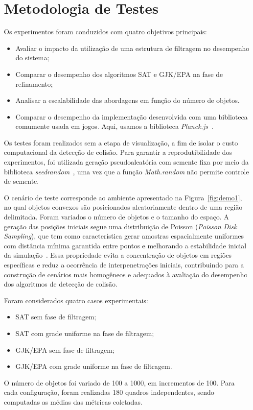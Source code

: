 \section{Metodologia de Testes}

Os experimentos foram conduzidos com quatro objetivos principais:
\begin{itemize}
    \item Avaliar o impacto da utilização de uma estrutura de filtragem no desempenho do sistema;
    \item Comparar o desempenho dos algoritmos SAT e GJK/EPA na fase de refinamento;
    \item Analisar a escalabilidade das abordagens em função do número de objetos.
    \item Comparar o desempenho da implementação desenvolvida com uma biblioteca comumente usada em jogos. Aqui, usamos a  biblioteca \textit{Planck.js}~\cite{planckjs}.
\end{itemize}
Os testes foram realizados sem a etapa de visualização, a fim de isolar o custo computacional da detecção de colisão. Para garantir a reprodutibilidade dos experimentos, foi utilizada geração pseudoaleatória com semente fixa por meio da biblioteca \textit{seedrandom}~\cite{bau2019seedrandom}, uma vez que a função \textit{Math.random} não permite controle de semente.

O cenário de teste corresponde ao ambiente apresentado na Figura~\ref{fig:demo1}, no qual objetos convexos são posicionados aleatoriamente dentro de uma região delimitada. Foram variados o número de objetos e o tamanho do espaço. A geração das posições iniciais segue uma distribuição de Poisson (\textit{Poisson Disk Sampling}), que tem como característica gerar amostras espacialmente uniformes com distância mínima garantida entre pontos e melhorando a estabilidade inicial da simulação~\cite{bridson2007poisson}. Essa propriedade evita a concentração de objetos em regiões específicas e reduz a ocorrência de interpenetrações iniciais, contribuindo para a construção de cenários mais homogêneos e adequados à avaliação do desempenho dos algoritmos de detecção de colisão.

Foram considerados quatro casos experimentais:
\begin{itemize}
    \item SAT sem fase de filtragem;
    \item SAT com grade uniforme na fase de filtragem;
    \item GJK/EPA sem fase de filtragem;
    \item GJK/EPA com grade uniforme na fase de filtragem.
\end{itemize}
O número de objetos foi variado de 100 a 1000, em incrementos de 100. Para cada configuração, foram realizadas 180 quadros independentes, sendo computadas as médias das métricas coletadas.

